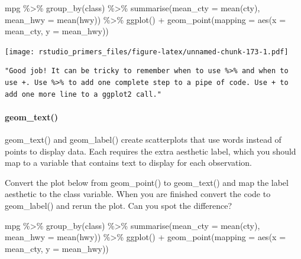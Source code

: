 \documentclass[
]{article}
\newenvironment{Shaded}{\begin{snugshade}}{\end{snugshade}}
\newcommand{\AttributeTok}[1]{\textcolor[rgb]{0.77,0.63,0.00}{#1}}
\newcommand{\FunctionTok}[1]{\textcolor[rgb]{0.00,0.00,0.00}{#1}}
\newcommand{\NormalTok}[1]{#1}
\newcommand{\SpecialCharTok}[1]{\textcolor[rgb]{0.00,0.00,0.00}{#1}}
\begin{document}
\begin{Shaded}
\begin{Highlighting}[]
\NormalTok{mpg }\SpecialCharTok{\%\textgreater{}\%} 
  \FunctionTok{group\_by}\NormalTok{(class) }\SpecialCharTok{\%\textgreater{}\%} 
  \FunctionTok{summarise}\NormalTok{(}\AttributeTok{mean\_cty =} \FunctionTok{mean}\NormalTok{(cty), }\AttributeTok{mean\_hwy =} \FunctionTok{mean}\NormalTok{(hwy)) }\SpecialCharTok{\%\textgreater{}\%} 
  \FunctionTok{ggplot}\NormalTok{() }\SpecialCharTok{+} 
    \FunctionTok{geom\_point}\NormalTok{(}\AttributeTok{mapping =} \FunctionTok{aes}\NormalTok{(}\AttributeTok{x =}\NormalTok{ mean\_cty, }\AttributeTok{y =}\NormalTok{ mean\_hwy))}
\end{Highlighting}
\end{Shaded}

\texttt{[image: rstudio\_primers\_files/figure-latex/unnamed-chunk-173-1.pdf]}

\begin{verbatim}
"Good job! It can be tricky to remember when to use %>% and when to use +. Use %>% to add one complete step to a pipe of code. Use + to add one more line to a ggplot2 call."
\end{verbatim}

\hypertarget{geom_text}{%
\paragraph{geom\_text()}\label{geom_text}}

geom\_text() and geom\_label() create scatterplots that use words
instead of points to display data. Each requires the extra aesthetic
label, which you should map to a variable that contains text to display
for each observation.

Convert the plot below from geom\_point() to geom\_text() and map the
label aesthetic to the class variable. When you are finished convert the
code to geom\_label() and rerun the plot. Can you spot the difference?

\begin{Shaded}
\begin{Highlighting}[]
\NormalTok{mpg }\SpecialCharTok{\%\textgreater{}\%} 
  \FunctionTok{group\_by}\NormalTok{(class) }\SpecialCharTok{\%\textgreater{}\%} 
  \FunctionTok{summarise}\NormalTok{(}\AttributeTok{mean\_cty =} \FunctionTok{mean}\NormalTok{(cty), }\AttributeTok{mean\_hwy =} \FunctionTok{mean}\NormalTok{(hwy)) }\SpecialCharTok{\%\textgreater{}\%} 
  \FunctionTok{ggplot}\NormalTok{() }\SpecialCharTok{+}
    \FunctionTok{geom\_point}\NormalTok{(}\AttributeTok{mapping =} \FunctionTok{aes}\NormalTok{(}\AttributeTok{x =}\NormalTok{ mean\_cty, }\AttributeTok{y =}\NormalTok{ mean\_hwy))}
\end{Highlighting}
\end{Shaded}
\end{document}
